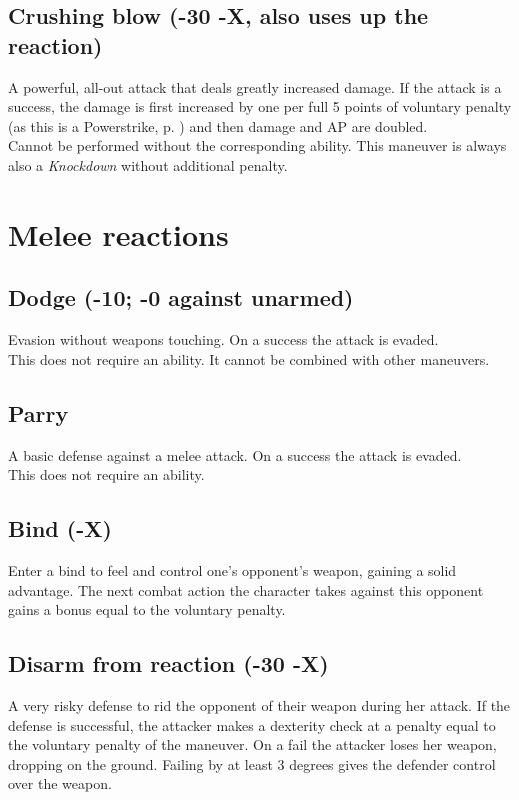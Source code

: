 \subsection*{Crushing blow (-30 -X, also uses up the reaction)}
A powerful, all-out attack that deals greatly increased damage.
If the attack is a success,
	the damage is first increased by one per full 5 points of voluntary penalty
	(as this is a Powerstrike, p. \pageref{mvr:powerstrike}) and
	then damage and AP are doubled.\\
Cannot be performed without the corresponding ability. This maneuver is always also a \emph{Knockdown} without additional penalty.

\section{Melee reactions}
\subsection*{Dodge (-10; -0 against unarmed)}
Evasion without weapons touching. On a success the attack is evaded.\\
This does not require an ability. It cannot be combined with other maneuvers.
\subsection*{Parry}
A basic defense against a melee attack. On a success the attack is evaded.\\
This does not require an ability.
\subsection*{Bind (-X)}
Enter a bind to feel and control one’s opponent’s weapon,
	gaining a solid advantage.
The next combat action the character takes against this opponent gains a bonus equal to the voluntary penalty.
\subsection*{Disarm from reaction (-30 -X)}
A very risky defense to rid the opponent of their weapon during her attack. If the defense is successful, the attacker makes a dexterity check at a penalty equal to the voluntary penalty of the maneuver. On a fail the attacker loses her weapon, dropping on the ground. Failing by at least 3 degrees gives the defender control over the weapon.
